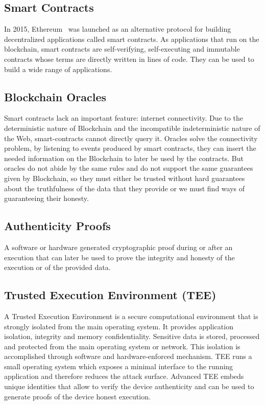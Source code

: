 \documentclass[final,3p,12pt,twocolumn]{elsarticle}
\begin{document}
\subsection{Smart Contracts}
In 2015, Ethereum~\citet{GavinWood2014} was launched as an alternative protocol for building decentralized applications called smart contracts. As applications that run on the blockchain, smart contracts are self-verifying, self-executing and immutable contracts whose terms are directly written in lines of code. They can be used to build a wide range of applications.

\subsection{Blockchain Oracles}
Smart contracts lack an important feature: internet connectivity. Due to the deterministic nature of Blockchain and the incompatible indeterministic nature of the Web, smart-contracts cannot directly query it.
Oracles solve the connectivity problem, by listening to events produced by smart contracts, they can insert the needed information on the Blockchain to later be used by the contracts. But oracles do not abide by the same rules and do not support the same guarantees given by Blockchain, so they must either be trusted without hard guarantees about the truthfulness of the data that they provide or we must find ways of guaranteeing their honesty.

\subsection{Authenticity Proofs}
A software or hardware generated cryptographic proof during or after an execution that can later be used to prove the integrity and honesty of the execution or of the provided data.

\subsection{Trusted Execution Environment (TEE)}
A Trusted Execution Environment is a secure computational environment that is strongly isolated from the main operating system. It provides application isolation, integrity and memory confidentiality. Sensitive data is stored, processed and protected from the main operating system or network. This isolation is accomplished through software and hardware-enforced mechanism. TEE runs a small operating system which exposes a minimal interface to the running application and therefore reduces the attack surface. Advanced TEE embeds unique identities that allow to verify the device authenticity and can be used to generate proofs of the device honest execution.
\end{document}
